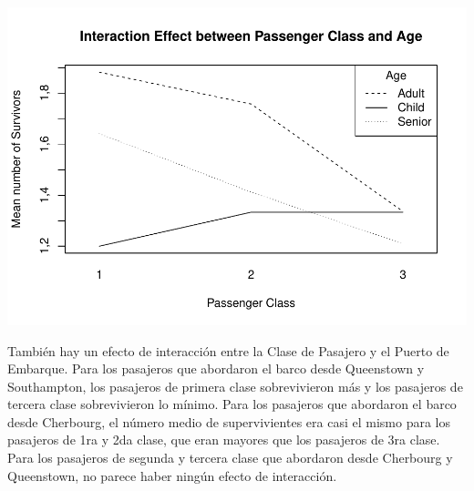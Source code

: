 \documentclass[]{article}
\newenvironment{Shaded}{\begin{snugshade}}{\end{snugshade}}
\newcommand{\KeywordTok}[1]{\textcolor[rgb]{0.13,0.29,0.53}{\textbf{#1}}}
\newcommand{\DataTypeTok}[1]{\textcolor[rgb]{0.13,0.29,0.53}{#1}}
\newcommand{\StringTok}[1]{\textcolor[rgb]{0.31,0.60,0.02}{#1}}
\newcommand{\OtherTok}[1]{\textcolor[rgb]{0.56,0.35,0.01}{#1}}
\newcommand{\OperatorTok}[1]{\textcolor[rgb]{0.81,0.36,0.00}{\textbf{#1}}}
\newcommand{\NormalTok}[1]{#1}
\begin{document}
\begin{Shaded}
\end{Shaded}

\includegraphics{titanicDataClean_files/figure-latex/unnamed-chunk-18-1.pdf}

También hay un efecto de interacción entre la Clase de Pasajero y el
Puerto de Embarque. Para los pasajeros que abordaron el barco desde
Queenstown y Southampton, los pasajeros de primera clase sobrevivieron
más y los pasajeros de tercera clase sobrevivieron lo mínimo. Para los
pasajeros que abordaron el barco desde Cherbourg, el número medio de
supervivientes era casi el mismo para los pasajeros de 1ra y 2da clase,
que eran mayores que los pasajeros de 3ra clase. Para los pasajeros de
segunda y tercera clase que abordaron desde Cherbourg y Queenstown, no
parece haber ningún efecto de interacción.
\end{document}

